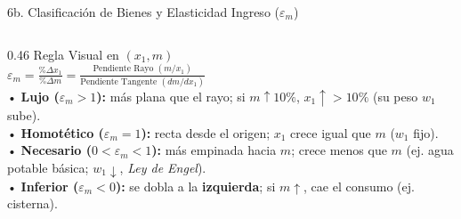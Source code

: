 \documentclass[aspectratio=169, 10pt]{beamer}
\begin{document}
\begin{frame}{6b. Clasificación de Bienes y Elasticidad Ingreso (\(\varepsilon_m\))}
\begin{columns}[T]
    \begin{column}{0.46\textwidth}
      {\scriptsize\color{grisTexto}Regla Visual en \((x_1, m)\)}\\[1pt]
      {\normalsize\color{azulPrincipal}\textbf{\(\varepsilon_m = \frac{\%\Delta x_1}{\%\Delta m} = \frac{\text{Pendiente Rayo }(m/x_1)}{\text{Pendiente Tangente }(dm/dx_1)}\)}}\\[6pt]
      {\scriptsize
        • \textcolor{naranjaAcento}{\textbf{Lujo (\(\varepsilon_m > 1\)):}} más plana que el rayo; si \(m \uparrow 10\%\), \(x_1 \uparrow >10\%\) (su peso \(w_1\) sube).\\
        • \textcolor{azulPrincipal}{\textbf{Homotético (\(\varepsilon_m = 1\)):}} recta desde el origen; \(x_1\) crece igual que \(m\) (\(w_1\) fijo).\\
        • \textcolor{verdeAcento}{\textbf{Necesario (\(0 < \varepsilon_m < 1\)):}} más empinada hacia \(m\); crece menos que \(m\) (ej. agua potable básica; \(w_1 \downarrow\), \emph{Ley de Engel}).\\
        • \textcolor{rojoAcento}{\textbf{Inferior (\(\varepsilon_m < 0\)):}} se dobla a la \textbf{izquierda}; si \(m \uparrow\), cae el consumo (ej. cisterna).\\[5pt]
      }
    \end{column}
  \end{columns}

\end{frame}
\end{document}
